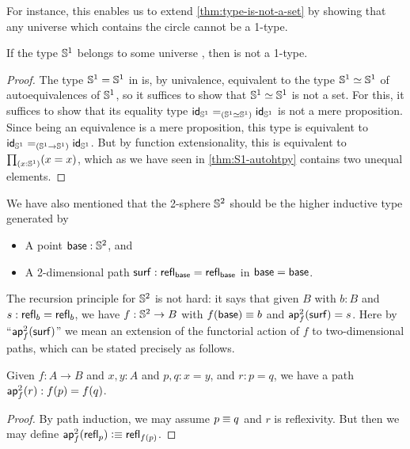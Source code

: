 For instance, this enables us to extend \cref{thm:type-is-not-a-set} by showing that any universe which contains the circle cannot be a 1-type.

\begin{cor}
  If the type $\Sn^1$ belongs to some universe \type, then \type is not a 1-type.
\end{cor}
\begin{proof}
  The type $\Sn^1=\Sn^1$ in \type is, by univalence, equivalent to the type $\eqv{\Sn^1}{\Sn^1}$ of auto\-equivalences of $\Sn^1$, so it suffices to show that $\eqv{\Sn^1}{\Sn^1}$ is not a set.
  For this, it suffices to show that its equality type $\id[(\eqv{\Sn^1}{\Sn^1})]{\idfunc[\Sn^1]}{\idfunc[\Sn^1]}$ is not a mere proposition.
  Since being an equivalence is a mere proposition, this type is equivalent to $\id[(\Sn^1\to\Sn^1)]{\idfunc[\Sn^1]}{\idfunc[\Sn^1]}$.
  But by function extensionality, this is equivalent to $\prd{x:\Sn^1} (x=x)$, which as we have seen in \cref{thm:S1-autohtpy} contains two unequal elements.
\end{proof}

%

%
%
We have also mentioned that the 2-sphere $\Sn^2$ should be the higher inductive type generated by
\begin{itemize}
\item A point $\base:\Sn^2$, and
\item A 2-dimensional path $\surf:\refl{\base} = \refl{\base}$ in ${\base=\base}$.
\end{itemize}
%
The recursion principle for $\Sn^2$ is not hard: it says that given $B$ with $b:B$ and $s:\refl b = \refl b$, we have $f:\Sn^2\to B$ with $f(\base)\jdeq b$ and $\aptwo f \surf = s$.
Here by ``$\aptwo f \surf$'' we mean an extension of the functorial action of $f$ to two-dimensional paths, which can be stated precisely as follows.

\begin{lem}\label{thm:ap2}
  Given $f:A\to B$ and $x,y:A$ and $p,q:x=y$, and $r:p=q$, we have a path $\aptwo f r : \ap f p = \ap f q$.
\end{lem}
\begin{proof}
  By path induction, we may assume $p\jdeq q$ and $r$ is reflexivity.
  But then we may define $\aptwo f {\refl p} \defeq \refl{\ap f p}$.
\end{proof}

